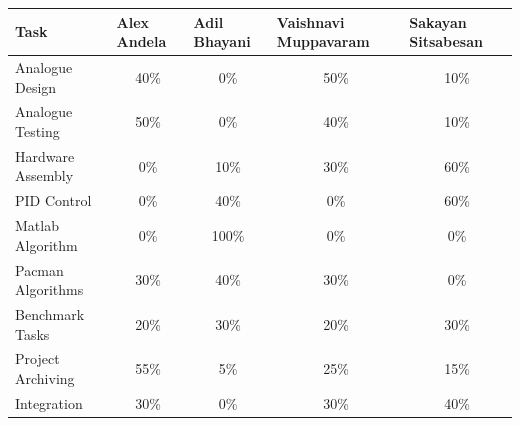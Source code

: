 \documentclass{article}
\begin{document}
\begin{table}[h]
\centering
\label{my-label}
\begin{tabular}{@{}l|cccc@{}}
\toprule
Task                          & \multicolumn{1}{l}{Alex Andela} & \multicolumn{1}{l}{Adil Bhayani} & \multicolumn{1}{l}{Vaishnavi Muppavaram} & \multicolumn{1}{l}{Sakayan Sitsabesan} \\ \midrule
Analogue Design               & 40\%                            & 0\%                              & 50\%                                     & 10\%                                   \\
Analogue Testing              & 50\%                            & 0\%                              & 40\%                                     & 10\%                                   \\
Hardware Assembly             & 0\%                             & 10\%                             & 30\%                                     & 60\%                                   \\
PID Control                   & 0\%                             & 40\%                             & 0\%                                      & 60\%                                   \\
Matlab Algorithm              & 0\%                             & 100\%                            & 0\%                                      & 0\%                                    \\
Pacman Algorithms             & 30\%                            & 40\%                             & 30\%                                     & 0\%                                    \\
Benchmark Tasks               & 20\%                            & 30\%                             & 20\%                                     & 30\%                                   \\
Project Archiving             & 55\%                            & 5\%                              & 25\%                                     & 15\%                                   \\
Integration & 30\%                            & 0\%                              & 30\%                                     & 40\%                                   \\ \bottomrule
\end{tabular}
\end{table}

\end{document}

